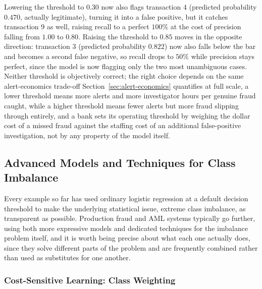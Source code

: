 \documentclass[../ai_in_finance]{subfiles}
\begin{document}
Lowering the threshold to $0.30$ now also flags transaction 4 (predicted probability $0.470$, actually legitimate), turning it into a false positive, but it catches transaction 9 as well, raising recall to a perfect $100\%$ at the cost of precision falling from $1.00$ to $0.80$. Raising the threshold to $0.85$ moves in the opposite direction: transaction 3 (predicted probability $0.822$) now also falls below the bar and becomes a second false negative, so recall drops to $50\%$ while precision stays perfect, since the model is now flagging only the two most unambiguous cases. Neither threshold is objectively correct; the right choice depends on the same alert-economics trade-off Section~\ref{sec:alert-economics} quantifies at full scale, a lower threshold means more alerts and more investigator hours per genuine fraud caught, while a higher threshold means fewer alerts but more fraud slipping through entirely, and a bank sets its operating threshold by weighing the dollar cost of a missed fraud against the staffing cost of an additional false-positive investigation, not by any property of the model itself.

\subsection{Advanced Models and Techniques for Class Imbalance}
\label{sec:advanced-imbalance}

Every example so far has used ordinary logistic regression at a default decision threshold to make the underlying statistical issue, extreme class imbalance, as transparent as possible. Production fraud and AML systems typically go further, using both more expressive models and dedicated techniques for the imbalance problem itself, and it is worth being precise about what each one actually does, since they solve different parts of the problem and are frequently combined rather than used as substitutes for one another.

\subsubsection*{Cost-Sensitive Learning: Class Weighting}
\end{document}
